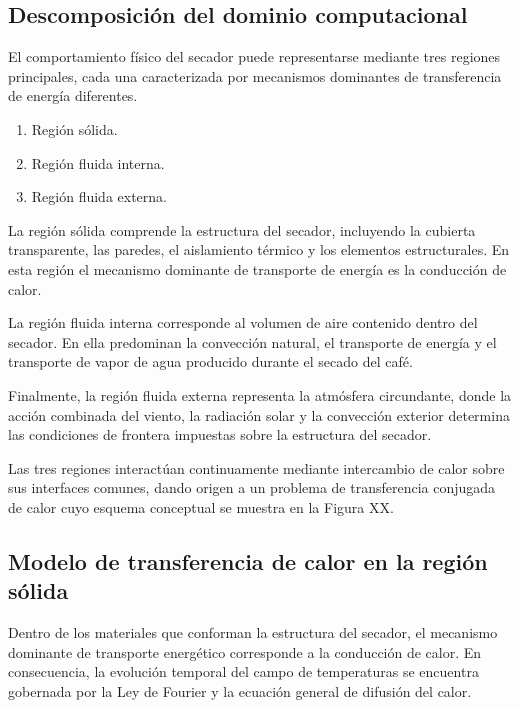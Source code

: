 \subsection{Descomposición del dominio computacional}

El comportamiento físico del secador puede representarse mediante tres regiones principales, cada una caracterizada por mecanismos dominantes de transferencia de energía diferentes.

\begin{enumerate}

\item Región sólida.

\item Región fluida interna.

\item Región fluida externa.

\end{enumerate}

La región sólida comprende la estructura del secador, incluyendo la cubierta transparente, las paredes, el aislamiento térmico y los elementos estructurales. En esta región el mecanismo dominante de transporte de energía es la conducción de calor.

La región fluida interna corresponde al volumen de aire contenido dentro del secador. En ella predominan la convección natural, el transporte de energía y el transporte de vapor de agua producido durante el secado del café.

Finalmente, la región fluida externa representa la atmósfera circundante, donde la acción combinada del viento, la radiación solar y la convección exterior determina las condiciones de frontera impuestas sobre la estructura del secador.

Las tres regiones interactúan continuamente mediante intercambio de calor sobre sus interfaces comunes, dando origen a un problema de transferencia conjugada de calor cuyo esquema conceptual se muestra en la Figura XX.

\subsection{Modelo de transferencia de calor en la región sólida}

Dentro de los materiales que conforman la estructura del secador, el mecanismo dominante de transporte energético corresponde a la conducción de calor. En consecuencia, la evolución temporal del campo de temperaturas se encuentra gobernada por la Ley de Fourier y la ecuación general de difusión del calor.

